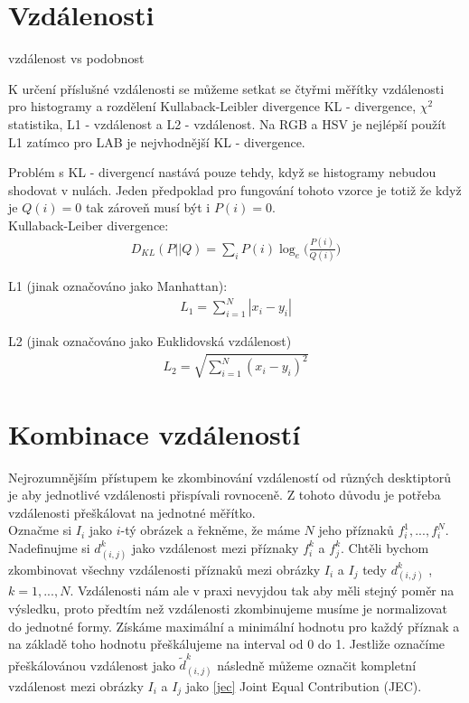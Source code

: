 \documentclass[czech,BP]{thesiskiv}
\begin{document}
\section{Vzdálenosti}
vzdálenost vs podobnost

 K určení příslušné vzdálenosti se můžeme setkat se čtyřmi měřítky vzdálenosti pro histogramy a rozdělení Kullaback-Leibler divergence KL - divergence, $\chi^2$ statistika, L1 - vzdálenost a L2 - vzdálenost. Na RGB a HSV je nejlépší použít L1 zatímco pro LAB je nejvhodnější KL - divergence. 

Problém s KL - divergencí nastává pouze tehdy, když se histogramy nebudou shodovat v nulách. Jeden předpoklad pro fungování tohoto vzorce je totiž že když je $Q(i) = 0$ tak zároveň musí být i $P(i) = 0$. \\

Kullaback-Leiber divergence:
\begin{align}
   \label{kl}  D_{KL} (P || Q) = \sum_{i} P(i) \log_e \bigg({\frac{P(i)}{Q(i)}} \bigg) 
\end{align}

L1 (jinak označováno jako Manhattan):
\begin{align}
   \label{L1} L_1 = \sum_{i=1}^{N} |x_i - y_i|  
\end{align}

L2 (jinak označováno jako Euklidovská vzdálenost)
\begin{align}
   \label{L2} L_2 = \sqrt{\sum_{i=1}^{N} (x_i - y_i)^2}  
\end{align}
 

\section{Kombinace vzdáleností}
Nejrozumnějším přístupem ke zkombinování vzdáleností od různých desktiptorů je aby jednotlivé vzdálenosti přispívali rovnoceně. Z tohoto důvodu je potřeba vzdálenosti přeškálovat na jednotné měřítko.\\
Označme si $I_i$ jako $i$-tý obrázek a řekněme, že máme $N$ jeho příznaků $f_i^1, ..., f_i^N$. Nadefinujme si $d_{(i,j)}^k$ jako vzdálenost mezi příznaky $f_i^k$ a $f_j^k$. Chtěli bychom zkombinovat všechny vzdálenosti příznaků mezi obrázky $I_i$ a $I_j$ tedy $d_{(i,j)}^k$ , $k=1, ..., N$.  Vzdálenosti nám ale v praxi nevyjdou tak aby měli stejný poměr na výsledku, proto předtím než vzdálenosti zkombinujeme musíme je normalizovat do jednotné formy. Získáme maximální a minimální hodnotu pro každý příznak a na základě toho hodnotu přeškálujeme na interval od 0 do 1. Jestliže označíme přeškálovánou vzdálenost jako ${\tilde{d}_{(i,j)}^k}$ následně můžeme označit kompletní vzdálenost mezi obrázky $I_i$ a $I_j$ jako \eqref{jec} Joint Equal Contribution (JEC). 
\end{document}
